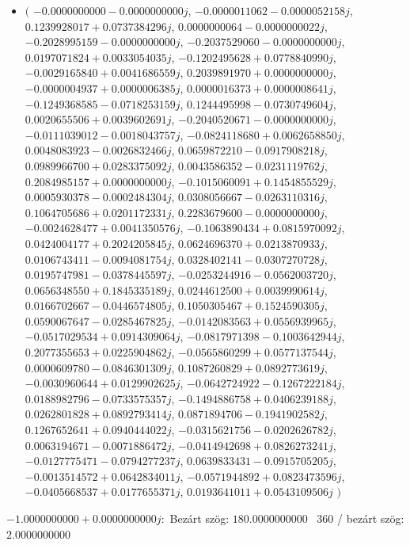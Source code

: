\documentclass[14pt,a4paper]{article}
\begin{document}
\begin{itemize}
\item
$\big($
$-0.0000000000-0.0000000000j$, $-0.0000011062-0.0000052158j$, $0.1239928017+0.0737384296j$, $0.0000000064-0.0000000022j$, $-0.2028995159-0.0000000000j$, $-0.2037529060-0.0000000000j$, $0.0197071824+0.0033054035j$, $-0.1202495628+0.0778840990j$, $-0.0029165840+0.0041686559j$, $0.2039891970+0.0000000000j$, $-0.0000004937+0.0000006385j$, $0.0000016373+0.0000008641j$, $-0.1249368585-0.0718253159j$, $0.1244495998-0.0730749604j$, $0.0020655506+0.0039602691j$, $-0.2040520671-0.0000000000j$, $-0.0111039012-0.0018043757j$, $-0.0824118680+0.0062658850j$, $0.0048083923-0.0026832466j$, $0.0659872210-0.0917908218j$, $0.0989966700+0.0283375092j$, $0.0043586352-0.0231119762j$, $0.2084985157+0.0000000000j$, $-0.1015060091+0.1454855529j$, $0.0005930378-0.0002484304j$, $0.0308056667-0.0263110316j$, $0.1064705686+0.0201172331j$, $0.2283679600-0.0000000000j$, $-0.0024628477+0.0041350576j$, $-0.1063890434+0.0815970092j$, $0.0424004177+0.2024205845j$, $0.0624696370+0.0213870933j$, $0.0106743411-0.0094081754j$, $0.0328402141-0.0307270728j$, $0.0195747981-0.0378445597j$, $-0.0253244916-0.0562003720j$, $0.0656348550+0.1845335189j$, $0.0244612500+0.0039990614j$, $0.0166702667-0.0446574805j$, $0.1050305467+0.1524590305j$, $0.0590067647-0.0285467825j$, $-0.0142083563+0.0556939965j$, $-0.0517029534+0.0914309064j$, $-0.0817971398-0.1003642944j$, $0.2077355653+0.0225904862j$, $-0.0565860299+0.0577137544j$, $0.0000609780-0.0846301309j$, $0.1087260829+0.0892773619j$, $-0.0030960644+0.0129902625j$, $-0.0642724922-0.1267222184j$, $0.0188982796-0.0733575357j$, $-0.1494886758+0.0406239188j$, $0.0262801828+0.0892793414j$, $0.0871894706-0.1941902582j$, $0.1267652641+0.0940444022j$, $-0.0315621756-0.0202626782j$, $0.0063194671-0.0071886472j$, $-0.0414942698+0.0826273241j$, $-0.0127775471-0.0794277237j$, $0.0639833431-0.0915705205j$, $-0.0013514572+0.0642834011j$, $-0.0571944892+0.0823473596j$, $-0.0405668537+0.0177655371j$, $0.0193641011+0.0543109506j$
$\big)$
\end{itemize}
$-1.0000000000+0.0000000000j$:\
Bezárt szög: $180.0000000000$ \
360 / bezárt szög: $2.0000000000$\
\end{document}
